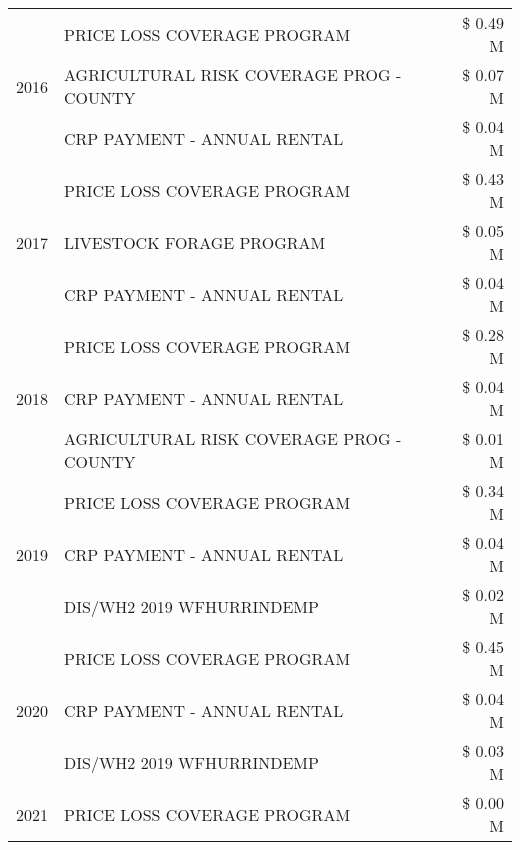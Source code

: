 \begin{tabular}{llr}
\multirow[t]{3}{*}{2016} & PRICE LOSS COVERAGE PROGRAM                   & \$ 0.49 M \\
 & AGRICULTURAL RISK COVERAGE PROG - COUNTY      & \$ 0.07 M \\
 & CRP PAYMENT - ANNUAL RENTAL                   & \$ 0.04 M \\
\cline{1-3}
\multirow[t]{3}{*}{2017} & PRICE LOSS COVERAGE PROGRAM & \$ 0.43 M \\
 & LIVESTOCK FORAGE PROGRAM & \$ 0.05 M \\
 & CRP PAYMENT - ANNUAL RENTAL & \$ 0.04 M \\
\cline{1-3}
\multirow[t]{3}{*}{2018} & PRICE LOSS COVERAGE PROGRAM & \$ 0.28 M \\
 & CRP PAYMENT - ANNUAL RENTAL & \$ 0.04 M \\
 & AGRICULTURAL RISK COVERAGE PROG - COUNTY & \$ 0.01 M \\
\cline{1-3}
\multirow[t]{3}{*}{2019} & PRICE LOSS COVERAGE PROGRAM & \$ 0.34 M \\
 & CRP PAYMENT - ANNUAL RENTAL & \$ 0.04 M \\
 & DIS/WH2 2019 WFHURRINDEMP & \$ 0.02 M \\
\cline{1-3}
\multirow[t]{3}{*}{2020} & PRICE LOSS COVERAGE PROGRAM & \$ 0.45 M \\
 & CRP PAYMENT - ANNUAL RENTAL & \$ 0.04 M \\
 & DIS/WH2 2019 WFHURRINDEMP & \$ 0.03 M \\
\cline{1-3}
2021 & PRICE LOSS COVERAGE PROGRAM & \$ 0.00 M \\
\cline{1-3}
\bottomrule
\end{tabular}
